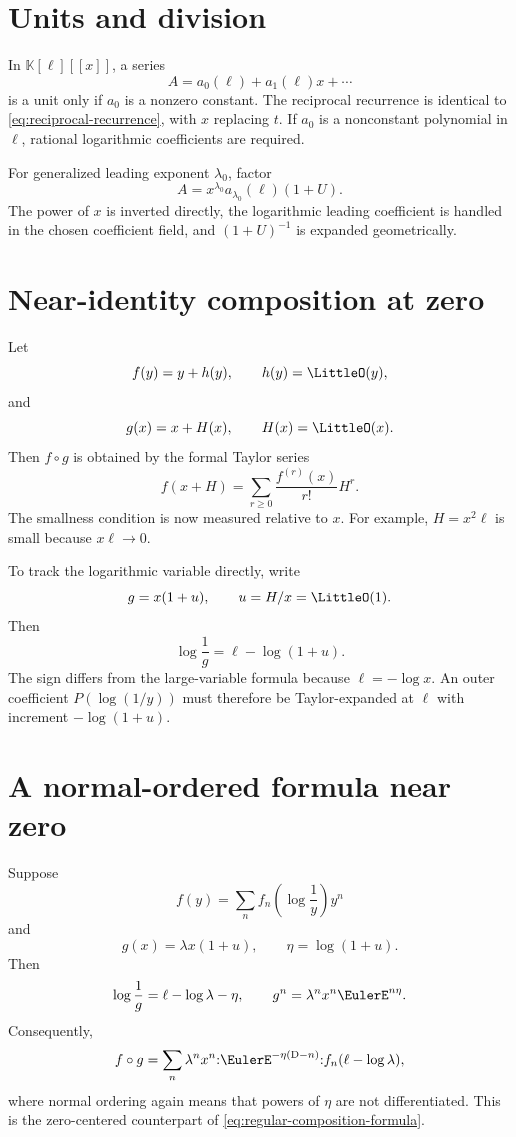 \documentclass[11pt,openany]{book}
\theoremstyle{definition}
\theoremstyle{plain}
\theoremstyle{remark}
\newcommand{\K}{\mathbb{K}}
\newcommand{\Dop}{\mathrm{D}}
\newcommand{\compose}{\mathbin{\circ}}
\begin{document}
\section{Units and division}
In \(\K[\ell][[x]]\), a series
\[
 A=a_0(\ell)+a_1(\ell)x+\cdots
\]
is a unit only if \(a_0\) is a nonzero constant.  The reciprocal recurrence is
identical to \cref{eq:reciprocal-recurrence}, with \(x\) replacing \(t\).
If \(a_0\) is a nonconstant polynomial in \(\ell\), rational logarithmic
coefficients are required.

For generalized leading exponent \(\lambda_0\), factor
\[
 A=x^{\lambda_0}a_{\lambda_0}(\ell)(1+U).
\]
The power of \(x\) is inverted directly, the logarithmic leading coefficient is
handled in the chosen coefficient field, and \((1+U)^{-1}\) is expanded
geometrically.

\section{Near-identity composition at zero}
Let
\[
 f(y)=y+h(y),
 \qquad h(y)=\LittleO(y),
\]
and
\[
 g(x)=x+H(x),
 \qquad H(x)=\LittleO(x).
\]
Then \(f\compose g\) is obtained by the formal Taylor series
\[
 f(x+H)=\sum_{r\ge0}\frac{f^{(r)}(x)}{r!}H^r.
\]
The smallness condition is now measured relative to \(x\).  For example,
\(H=x^2\ell\) is small because \(x\ell\to0\).

To track the logarithmic variable directly, write
\[
 g=x(1+u),
 \qquad u=H/x=\LittleO(1).
\]
Then
\begin{equation}\label{eq:small-log-compose}
 \log\frac1g
 =\ell-\log(1+u).
\end{equation}
The sign differs from the large-variable formula because
\(\ell=-\log x\).  An outer coefficient \(P(\log(1/y))\) must therefore be
Taylor-expanded at \(\ell\) with increment \(-\log(1+u)\).

\section{A normal-ordered formula near zero}
Suppose
\begin{equation}\label{eq:small-outer}
 f(y)=\sum_n f_n\!\left(\log\frac1y\right)y^n
\end{equation}
and
\[
 g(x)=\lambda x(1+u),
 \qquad \eta=\log(1+u).
\]
Then
\[
 \log\frac1g=\ell-\log\lambda-\eta,
 \qquad
 g^n=\lambda^nx^n\EulerE^{n\eta}.
\]
Consequently,
\begin{equation}\label{eq:small-normal-ordered}
 f\compose g
 =\sum_n\lambda^nx^n
 \mathopen{:}\EulerE^{-\eta(\Dop-n)}\mathclose{:}
 f_n(\ell-\log\lambda),
\end{equation}
where normal ordering again means that powers of \(\eta\) are not
differentiated.  This is the zero-centered counterpart of
\cref{eq:regular-composition-formula}.
\end{document}
